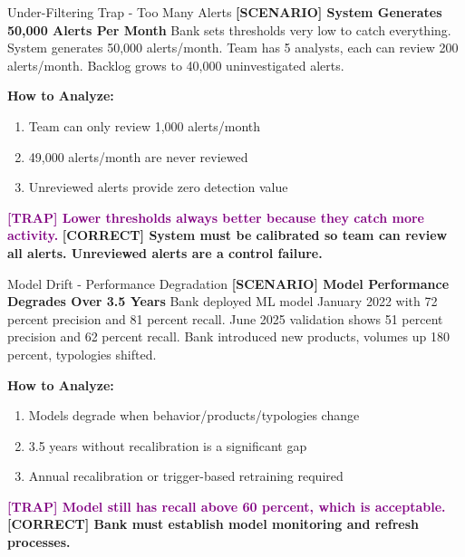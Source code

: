 \documentclass[11pt,a4paper]{beamer}
\newcommand{\trap}[1]{\textcolor{purple}{\textbf{[TRAP] #1}}}
\newcommand{\correct}[1]{\textcolor{green!50!black}{\textbf{[CORRECT] #1}}}
\newcommand{\scenario}[1]{\textcolor{blue!70!black}{\textbf{[SCENARIO] #1}}}
\begin{document}
	\begin{frame}{Under-Filtering Trap - Too Many Alerts}
		\scenario{System Generates 50,000 Alerts Per Month}
		Bank sets thresholds very low to catch everything. System generates 50,000 alerts/month. Team has 5 analysts, each can review 200 alerts/month. Backlog grows to 40,000 uninvestigated alerts.
		
		\vspace{0.1cm}
		\textbf{How to Analyze:}
		\begin{enumerate}
			\item Team can only review 1,000 alerts/month
			\item 49,000 alerts/month are never reviewed
			\item Unreviewed alerts provide zero detection value
		\end{enumerate}
		\trap{Lower thresholds always better because they catch more activity.}
		\correct{System must be calibrated so team can review all alerts. Unreviewed alerts are a control failure.}
	\end{frame}
	
	\begin{frame}{Model Drift - Performance Degradation}
		\scenario{Model Performance Degrades Over 3.5 Years}
		Bank deployed ML model January 2022 with 72 percent precision and 81 percent recall. June 2025 validation shows 51 percent precision and 62 percent recall. Bank introduced new products, volumes up 180 percent, typologies shifted.
		
		\vspace{0.1cm}
		\textbf{How to Analyze:}
		\begin{enumerate}
			\item Models degrade when behavior/products/typologies change
			\item 3.5 years without recalibration is a significant gap
			\item Annual recalibration or trigger-based retraining required
		\end{enumerate}
		\trap{Model still has recall above 60 percent, which is acceptable.}
		\correct{Bank must establish model monitoring and refresh processes.}
	\end{frame}
	
	
\end{document}
